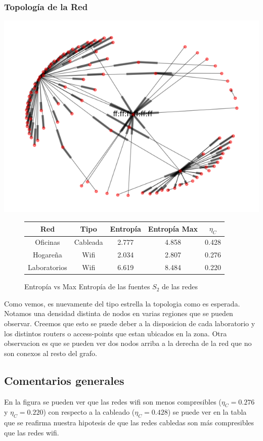 \subsubsection{Topolog\'ia de la Red}
\begin{center}
 \includegraphics[scale=0.6]{../plots/labos_s2_topologia.png}
\end{center}
\begin{figure}
	\centering
	\begin{tabular}{|c|c|c|c|c|}
		\hline
		Red & Tipo & Entropía & Entropía Max & $\eta_{C}$ \\
		\hline
		Oficinas & Cableada & 2.777 & 4.858 & 0.428 \\
		\hline
		Hogareña & Wifi & 2.034 & 2.807 & 0.276 \\
		\hline
		Laboratorios & Wifi & 6.619 & 8.484 & 0.220 \\
		\hline
	\end{tabular}
	\caption[fig:tabla]{Entropía vs Max Entropía de las fuentes $S_2$ de las redes}
\end{figure}

Como vemos, es nuevamente del tipo estrella la topologia como es esperada. Notamos una densidad
distinta de nodos en varias regiones que se pueden observar. Creemos que esto se puede deber
a la disposicion de cada laboratorio y los distintos routers o access-points que estan ubicados en la zona.
Otra observacion es que se pueden ver dos nodos arriba a la derecha de la red que no son conexos al resto del grafo.


\subsection{Comentarios generales}

En la figura \label{fig:tabla} se pueden ver que las redes wifi son menos compresibles ($\eta_{C}=0.276$ y $\eta_{C}=0.220$)
con respecto a la cableado ($\eta_{C}=0.428$) se puede ver en la tabla que se
reafirma nuestra hipotesis de que las redes cabledas son más compresibles que
las redes wifi.
